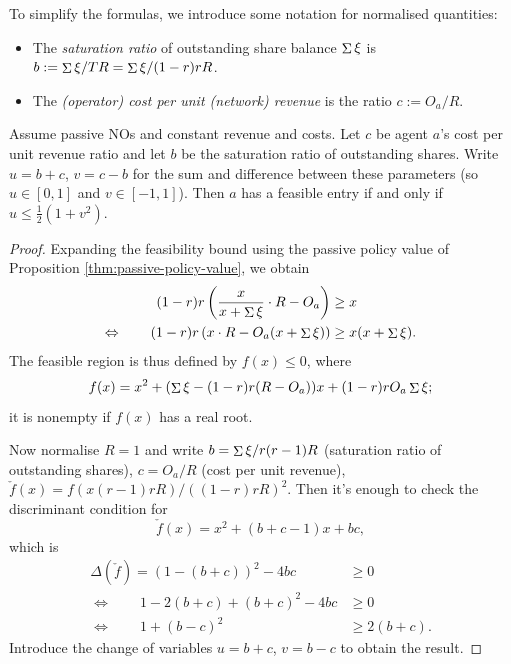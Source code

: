To simplify the formulas, we introduce some notation for normalised quantities:
%
\begin{itemize}
  \item The \emph{saturation ratio} of outstanding share balance $\mathop{\Sigma}\xi$ is $b:=\mathop{\Sigma}\xi/TR = \mathop{\Sigma}\xi/(1-r)rR$.
  \item The \emph{(operator) cost per unit (network) revenue} is the ratio $c:=O_a/R$.
\end{itemize}

\begin{proposition}
  \label{thm:feasible-entry}

  Assume passive NOs and constant revenue and costs.
  Let $c$ be agent $a$'s cost per unit revenue ratio and let $b$ be the saturation ratio of outstanding shares.
  Write $u=b+c$, $v=c - b$ for the sum and difference between these parameters (so $u\in[0,1]$ and $v\in[-1,1]$).
  Then $a$ has a feasible entry if and only if $u \leq \frac{1}{2}(1+v^2)$.

\end{proposition}
%
\begin{proof}

  Expanding the feasibility bound using the passive policy value of Proposition \ref{thm:passive-policy-value}, we obtain
  \begin{align*}
    (1-r)r\left(\frac{x}{x+\mathop{\Sigma}{\xi}} \cdot R - O_a \right) &\geq  x \\
    \Leftrightarrow \qquad (1-r)r\left(x \cdot R - O_a (x+\mathop{\Sigma}\xi) \right) &\geq x(x+\mathop{\Sigma}\xi) .
  \end{align*}
  The feasible region is thus defined by $f(x)\leq 0$, where
  \[
    f(x) = x^2 + (\mathop{\Sigma}\xi - (1-r)r(R-O_a))x + (1-r)rO_a\mathop{\Sigma}\xi;
  \]
  it is nonempty if $f(x)$ has a real root.

  Now normalise $R=1$ and write $b=\mathop{\Sigma}\xi/r(r-1)R$ (saturation ratio of outstanding shares), $c=O_a/R$ (cost per unit revenue), $\check{f}(x)=f(x(r-1)rR)/((1-r)rR)^2$.
  Then it's enough to check the discriminant condition for
  \[
    \check{f}(x) = x^2 + (b + c - 1)x + bc,
  \]
  which is
  \begin{align*}
    \Delta(\check{f}) = (1 - (b+c) )^2 - 4bc &\geq 0 \\
    \Leftrightarrow\qquad 1 - 2(b+c) + (b+c)^2 - 4bc &\geq 0 \\
    \Leftrightarrow\qquad 1 + (b-c)^2 &\geq 2(b+c).
  \end{align*}
  Introduce the change of variables $u=b+c$, $v=b-c$ to obtain the result.\qedhere

\end{proof}

